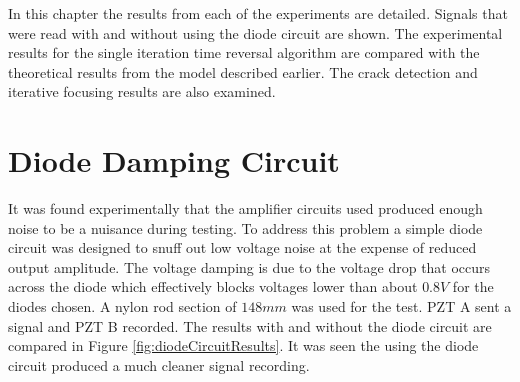 
In this chapter the results from each of the experiments are detailed. Signals that were read with and without using the diode circuit are shown. The experimental results for the single iteration time reversal algorithm are compared with the theoretical results from the model described earlier. The crack detection and iterative focusing results are also examined.

\section{Diode Damping Circuit}
It was found experimentally that the amplifier circuits used produced enough noise to be a nuisance during testing. To address this problem a simple diode circuit was designed to snuff out low voltage noise at the expense of reduced output amplitude. The voltage damping is due to the voltage drop that occurs across the diode which effectively blocks voltages lower than about $0.8V $ for the diodes chosen. A nylon rod section of $148 mm$ was used for the test. PZT A sent a signal and PZT B recorded. The results with and without the diode circuit are compared in Figure \ref{fig:diodeCircuitResults}. It was seen the using the diode circuit produced a much cleaner signal recording.

